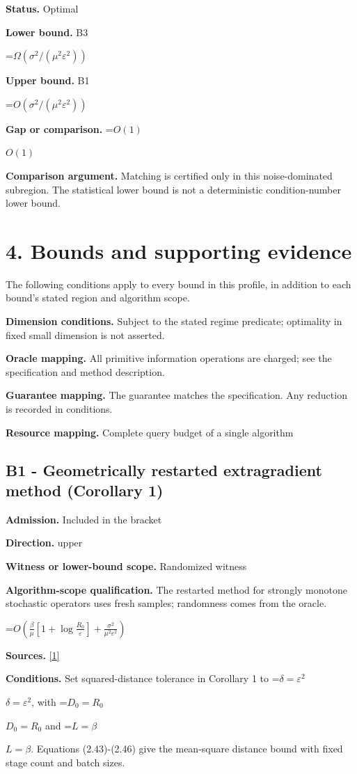 \documentclass[10pt,a4paper]{article}
\newcommand{\AtlasMath}[1]{\par\begingroup\centering\setbox0=\hbox{$\displaystyle #1$}\ifdim\wd0>1.4\linewidth\typeout{ATLAS WIDE FORMULA: \the\wd0}\fi\ifdim\wd0>\linewidth\resizebox{\linewidth}{!}{\box0}\else\box0\fi\par\endgroup}
\newcommand{\AtlasInlineMath}[1]{\begingroup\setbox0=\hbox{$#1$}\ifdim\wd0>.4\linewidth\endgroup\AtlasMath{#1}\else\endgroup$#1$\fi}
\begin{document}
\textbf{Status.} Optimal

\textbf{Lower bound.} B3

\AtlasMath{\Omega(\sigma^2/(\mu^2\varepsilon^2))}
\textbf{Upper bound.} B1

\AtlasMath{O(\sigma^2/(\mu^2\varepsilon^2))}
\textbf{Gap or comparison.} \AtlasInlineMath{O(1)}

\textbf{Comparison argument.} Matching is certified only in this noise-dominated subregion. The statistical lower bound is not a deterministic condition-number lower bound.

\section{4. Bounds and supporting evidence}
The following conditions apply to every bound in this profile, in addition to each bound's stated region and algorithm scope.

\textbf{Dimension conditions.} Subject to the stated regime predicate; optimality in fixed small dimension is not asserted.

\textbf{Oracle mapping.} All primitive information operations are charged; see the specification and method description.

\textbf{Guarantee mapping.} The guarantee matches the specification. Any reduction is recorded in conditions.

\textbf{Resource mapping.} Complete query budget of a single algorithm

\subsection{B1 - Geometrically restarted extragradient method (Corollary 1)}
\textbf{Admission.} Included in the bracket

\textbf{Direction.} upper

\textbf{Witness or lower-bound scope.} Randomized witness

\textbf{Algorithm-scope qualification.} The restarted method for strongly monotone stochastic operators uses fresh samples; randomness comes from the oracle.

\AtlasMath{O\!\left(\frac{\beta}{\mu}\left[1+\log\frac{R_0}{\varepsilon}\right]+\frac{\sigma^2}{\mu^2\varepsilon^2}\right)}
\textbf{Sources.} \href{https://arxiv.org/pdf/2609.04188v2}{[1]}

\textbf{Conditions.} Set squared-distance tolerance in Corollary 1 to \AtlasInlineMath{\delta=\varepsilon^2}, with \AtlasInlineMath{D_0=R_0} and \AtlasInlineMath{L=\beta}. Equations (2.43)-(2.46) give the mean-square distance bound with fixed stage count and batch sizes.
\end{document}
